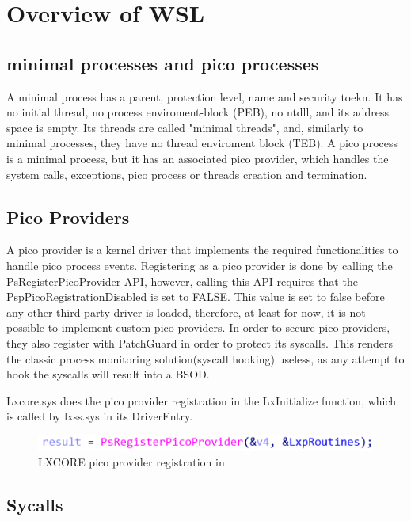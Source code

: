 \documentclass[conference]{IEEEtran}
\begin{document}
\section{Overview of WSL}
 
\subsection{minimal processes and pico processes}
    A minimal process has a parent, protection level, name and security toekn. It has no initial thread, no process enviroment-block (PEB),
    no ntdll, and its address space is empty. Its threads are called "minimal threads", and, similarly to minimal processes, they have no
    thread enviroment block (TEB). A pico process is a minimal process, but it has an associated pico provider, which handles the system calls,
    exceptions, pico process or threads creation and termination.

\subsection{Pico Providers}
    A pico provider is a kernel driver that implements the required functionalities to handle pico process events. Registering as a pico provider
    is done by calling the PsRegisterPicoProvider API, however, calling this API requires that the PspPicoRegistrationDisabled is set to FALSE.
    This value is set to false before any other third party driver is loaded, therefore, at least for now, it is not possible to implement
    custom pico providers. In order to secure pico providers, they also register with PatchGuard in order to protect its syscalls.
    This renders the classic process monitoring solution(syscall hooking) useless, as any attempt to hook the syscalls will result
    into a BSOD.
    \par{}
    Lxcore.sys does the pico provider registration in the LxInitialize function, which is called by lxss.sys in its DriverEntry.
    \begin{figure}[htbp]
        \centerline{\includegraphics{PsRegisterPicoProcess.png}}
        \caption{LXCORE pico provider registration in}
        \label{fig1}
    \end{figure}

\subsection{Sycalls}
\end{document}
